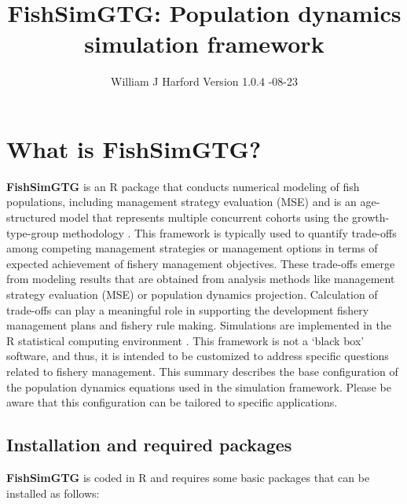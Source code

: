 \documentclass[
]{book}
\title{FishSimGTG: Population dynamics simulation framework}
\author{\begin{center}
William J Harford  
\newline
Version 1.0.4
\newline
2024-08-23
\end{center}}
\date{}
\begin{document}
\maketitle

{
\setcounter{tocdepth}{1}
\tableofcontents
}
\chapter{What is FishSimGTG?}\label{what-is-fishsimgtg}

\textbf{FishSimGTG} is an R package that conducts numerical modeling of fish populations, including management strategy evaluation (MSE) and is an age-structured model that represents multiple concurrent cohorts using the growth-type-group methodology \citep{walters_fisheries_2004}. This framework is typically used to quantify trade-offs among competing management strategies or management options in terms of expected achievement of fishery management objectives. These trade-offs emerge from modeling results that are obtained from analysis methods like management strategy evaluation (MSE) or population dynamics projection. Calculation of trade-offs can play a meaningful role in supporting the development fishery management plans and fishery rule making. Simulations are implemented in the R statistical computing environment \citep{r_core_team_r_2022}. This framework is not a `black box' software, and thus, it is intended to be customized to address specific questions related to fishery management. This summary describes the base configuration of the population dynamics equations used in the simulation framework. Please be aware that this configuration can be tailored to specific applications.

\section{Installation and required packages}\label{installation-and-required-packages}

\textbf{FishSimGTG} is coded in R \citep{r_core_team_r_2022} and requires some basic packages that can be installed as follows:
\end{document}
